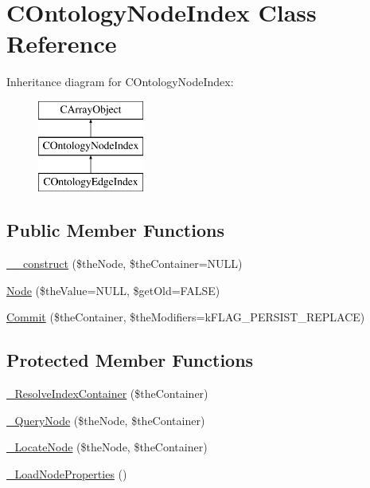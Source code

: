 \hypertarget{class_c_ontology_node_index}{\section{C\-Ontology\-Node\-Index Class Reference}
\label{class_c_ontology_node_index}
}
Inheritance diagram for C\-Ontology\-Node\-Index\-:\begin{figure}[H]
\begin{center}
\leavevmode
\includegraphics[height=3.000000cm]{class_c_ontology_node_index}
\end{center}
\end{figure}
\subsection*{Public Member Functions}
\begin{DoxyCompactItemize}
\item 
\hyperlink{class_c_ontology_node_index_adbebb66bc2fd26b7c116d57f8c7f29fb}{\-\_\-\-\_\-construct} (\$the\-Node, \$the\-Container=N\-U\-L\-L)
\item 
\hyperlink{class_c_ontology_node_index_a110494860d35b066b1d706694657aed5}{Node} (\$the\-Value=N\-U\-L\-L, \$get\-Old=F\-A\-L\-S\-E)
\item 
\hyperlink{class_c_ontology_node_index_aa66c1a98352f4f99beea4c9802d57de8}{Commit} (\$the\-Container, \$the\-Modifiers=k\-F\-L\-A\-G\-\_\-\-P\-E\-R\-S\-I\-S\-T\-\_\-\-R\-E\-P\-L\-A\-C\-E)
\end{DoxyCompactItemize}
\subsection*{Protected Member Functions}
\begin{DoxyCompactItemize}
\item 
\hyperlink{class_c_ontology_node_index_a7500db2a0cabb7d73301bbbac5b8ccd1}{\-\_\-\-Resolve\-Index\-Container} (\$the\-Container)
\item 
\hyperlink{class_c_ontology_node_index_a93c6e9f5627c6a77f30808adffec233f}{\-\_\-\-Query\-Node} (\$the\-Node, \$the\-Container)
\item 
\hyperlink{class_c_ontology_node_index_a5a77164ee17b82dd8284c6f8ede6a114}{\-\_\-\-Locate\-Node} (\$the\-Node, \$the\-Container)
\item 
\hyperlink{class_c_ontology_node_index_af999c84f8f32a5e0bae63d09b9703ee4}{\-\_\-\-Load\-Node\-Properties} ()
\end{DoxyCompactItemize}
